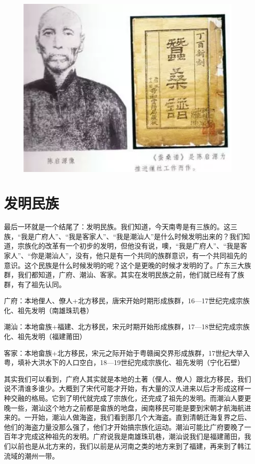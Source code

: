 \begin{figure}
	\centering
	\includegraphics[width=\textwidth]{images/image-69}
\end{figure}

\section{发明民族}

最后一环就是一个结尾了：发明民族。我们知道，今天南粤是有三族的。这三族，“我是广府人”、“我是客家人”、“我是潮汕人”是什么时候发明出来的？我们知道，宗族化的改革有一个初步的发明，但他没有说，噢，“我是广府人”、“我是客家人”、“你是潮汕人”，没有，他只是有一个共同的族群意识，有一个共同祖先的意识。这个民族是什么时候发明的呢？这个是更晚的时候才发明的了。广东三大族群，我们都知道，广府、潮汕、客家。其实在发明民族之前，他们就已经有了族群，有了祖先认同。

广府：本地俚人、僚人+北方移民，唐宋开始时期形成族群，16—17世纪完成宗族化、祖先发明（南雄珠玑巷）

潮汕：本地畲族+福建、北方移民，宋元时期开始形成族群，17—18世纪完成宗族化、祖先发明（福建莆田）

客家：本地畲族+北方移民，宋元之际开始于粤赣闽交界形成族群，17世纪大举入粤，填补大洪水下的人口空白，18—19世纪完成宗族化、祖先发明（宁化石壁）

其实我们可以看到，广府人其实就是本地的土著（俚人、僚人）跟北方移民，我们说不清谁多谁少。大概到了宋代可能才开始，有大量的汉人进来以后才形成这样一种交融的格局。它到了明代就完成了宗族化，还完成了祖先的发明。而潮汕人要更晚一些，潮汕这个地方之前都是畲族的地盘，闽南移民可能是要到宋朝才航海航进来的。一开始，潮汕人做海盗，我们看到那几个大海盗。直到清朝迁海复界之后、他们的海盗力量没那么强了，他们才开始搞宗族化运动。潮汕可能比广府要晚了一百年才完成这种祖先的发明。广府说我是南雄珠玑巷，潮汕说我们是福建莆田，我们以前也是从北方来的，我们以前是从河南之类的地方来到了福建，再来到了韩江流域的潮州一带。

